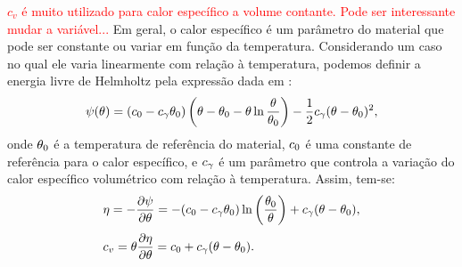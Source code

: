\documentclass[Tese.tex]{subfiles}
\begin{document}
\textcolor{red}{$c_v$ é muito utilizado para calor específico a volume contante. Pode ser interessante mudar a variável...}
Em geral, o calor específico é um parâmetro do material que pode ser constante ou variar em função da temperatura. Considerando um caso no qual ele varia linearmente com relação à temperatura, podemos definir a energia livre de Helmholtz pela expressão dada em :
\begin{equation}\label{eq:helmholtz-t-0}
\psi(\theta) = (c_0-c_{\gamma}\theta_0)\left(\theta-\theta_0-\theta \ln{\dfrac{\theta}{\theta_0}}\right)-\dfrac{1}{2}c_{\gamma}(\theta-\theta_0)^2,
\end{equation}
onde $\theta_0$ é a temperatura de referência do material, $c_0$ é uma constante de referência para o calor específico,  e $c_{\gamma}$ é um parâmetro que controla a variação do calor específico volumétrico com relação à temperatura. Assim, tem-se:
\begin{align}
&\eta = -\dfrac{\partial \psi}{\partial \theta} = -(c_0-c_{\gamma}\theta_0)\ln\left(\dfrac{\theta_0}{\theta}\right)+c_{\gamma}(\theta-\theta_0), \\[0.1cm]
&c_v = \theta\dfrac{\partial\eta}{\partial\theta} = c_0+c_{\gamma}(\theta - \theta_0). \label{eq:calor-especifico-0}
\end{align}
\end{document}
